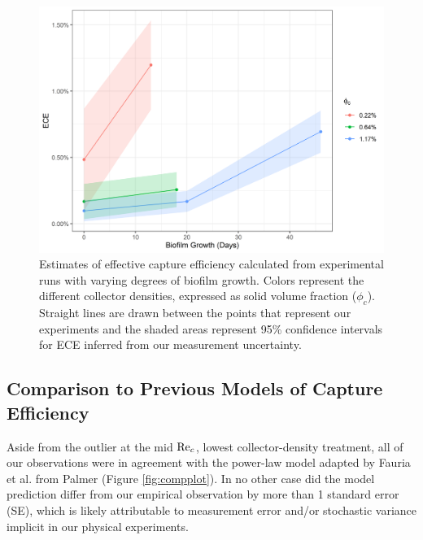 \documentclass[geosciences,article,submit,moreauthors,pdftex]{Definitions/mdpi}
\begin{document}
\begin{figure}[H]
\centering
\includegraphics[width=5in]{../pics/biofilm.png}
\caption{Estimates of effective capture efficiency calculated from experimental runs with varying degrees of biofilm growth. Colors represent the different collector densities, expressed as solid volume fraction ($\phi_c$). Straight lines are drawn between the points that represent our experiments and the shaded areas represent 95\% confidence intervals for ECE inferred from our measurement uncertainty.}
\label{fig:biofilm}
\end{figure}   

\subsection{Comparison to Previous Models of Capture Efficiency}

Aside from the outlier at the mid $\mathrm{Re}_c$, lowest collector-density treatment, all of our observations were in agreement with the power-law model adapted by Fauria et al. \cite{Fauria_2015} from Palmer \cite{Palmer_2004} (Figure \ref{fig:compplot}). In no other case did the model prediction differ from our empirical observation by more than 1 standard error (SE), which is likely attributable to measurement error and/or stochastic variance implicit in our physical experiments.
\end{document}
